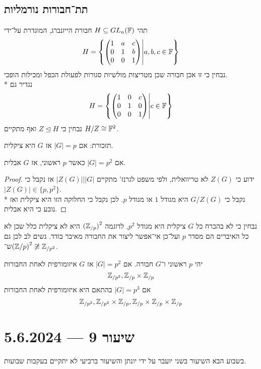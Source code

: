 \subsection{תת־חבורות נורמליות}
\begin{example}
	תהי $H \subseteq GL_n(\mathbb{F})$ חבורת הייזנברג, המוגדרת על־ידי
	\[
		H = \left\{
			\begin{pmatrix}
				1 & a & c \\
				0 & 1 & b \\
				0 & 0 & 1
			\end{pmatrix}
			\middle|
			a, b, c \in \mathbb{F}
		\right\}
	\]
	נבחין כי זו אכן חבורה שכן מטריצות מולשיות סגורות לפעולת הכפל ומכילות הופכי. \\*
	נגדיר גם
	\[
		H = \left\{
			\begin{pmatrix}
				1 & 0 & c \\
				0 & 1 & 0 \\
				0 & 0 & 1
			\end{pmatrix}
			\middle|
			c \in \mathbb{F}
		\right\}
	\]
	נבחין כי $Z \trianglelefteq H$ ואף מתקיים $H/Z \cong \mathbb{F}^2$.
\end{example}
\begin{lemma}
	תזכורת: אם $|G| = p$ אז $G$ היא ציקלית.
\end{lemma}
\begin{lemma}
	אם $|G| = p^2$ כאשר $p$ ראשוני, אז $G$ אבלית.
\end{lemma}
\begin{proof}
	ידוע כי $Z(G)$ לא טריוואלית, ולפי משפט לגרנז' מתקיים $|Z(G)| \Big| |G|$ אז נקבל כי $|Z(G)| \in \{ p, p^2 \}$. \\*
	נקבל כי $G/Z(G)$ היא מגודל $1$ או מגודל $p$. לכן נקבל כי החלוקה הזו היא ציקלית ואז נובע כי היא אבלית.
\end{proof}
נבחין כי לא בהכרח כל $G$ ציקלית היא מגודל $p^2$, לדוגמה ${(\mathbb{Z}_{/p})}^2$ היא לא ציקלית כלל שכן לא כל האיברים הם מסדר $p$ ועל־כן אי־אפשר ליצור את החבורה מאיבר בודד. נשים לב לכן גם ש־${(\mathbb{Z}/p)}^2 \not\cong \mathbb{Z}_{/p^2}$.
\begin{proposition}
	יהי $p$ ראשוני ו־$G$ חבורה. אם $|G| = p^2$ אז $G$ איזומורפית לאחת החבורות
	\[
		\mathbb{Z}_{/p^2}, \mathbb{Z}_{/p} \times \mathbb{Z}_{/p}
	\]
	אם $|G| = p^3$ בהתאם היא איזומורפית לאחת החבורות
	\[
		\mathbb{Z}_{/p^3}, \mathbb{Z}_{/p^2} \times \mathbb{Z}_{/p}, \mathbb{Z}_{/p} \times \mathbb{Z}_{/p} \times \mathbb{Z}_{/p}
	\]
\end{proposition}

\section{שיעור 9 --- 5.6.2024}
בשבוע הבא השיעור בשני יועבר על ידי יונתן והשיעור ברביעי לא יתקיים בעקבות שבועות.

